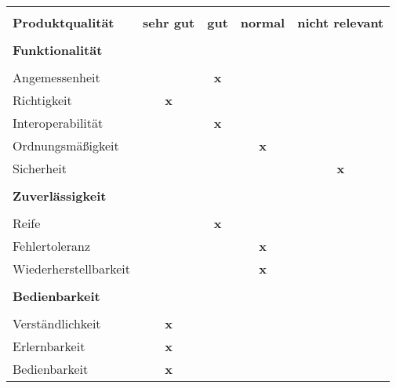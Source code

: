 \begin{table}[H]
\centering

\label{tabelle_qualitaetsziele}
\begin{tabular}{|lcccc|}
\hline 
\rowcolor[RGB]{191,191,255} &&&& \\[-0.35cm]
\rowcolor[RGB]{191,191,255}
\textbf{Produktqualität}       & \textbf{sehr gut} & \textbf{gut} & \textbf{normal} & \textbf{nicht relevant} \\[0.1cm]
\hline 
\rowcolor[RGB]{230,230,230}&&&& \\[-0.35cm] 
\rowcolor[RGB]{230,230,230}\textbf{Funktionalität} &&&&   				  \\[0.1cm] 
\hline &&&& \\[-0.4cm]
Angemessenheit        &          & \textbf{x}   &        &                \\[0.1cm]
Richtigkeit           & \textbf{x}        &     &        &                \\[0.1cm]
Interoperabilität     &          & \textbf{x}   &        &                \\[0.1cm]
Ordnungsmäßigkeit     &          &     & \textbf{x}      &                \\[0.1cm]
Sicherheit            &          &     &        & \textbf{x}              \\[0.1cm]
\rowcolor[RGB]{230,230,230}\hline &&&& \\[-0.35cm]
\rowcolor[RGB]{230,230,230}\textbf{Zuverlässigkeit} &&&&       							 		  \\[0.1cm] 
\hline &&&& \\[-0.4cm]
Reife                 &          & \textbf{x}   &        &                \\[0.1cm]
Fehlertoleranz        &          &     & \textbf{x}      &                \\[0.1cm]
Wiederherstellbarkeit &          &     & \textbf{x}      &                \\[0.1cm] 
\rowcolor[RGB]{230,230,230}\hline &&&& \\[-0.35cm]
\rowcolor[RGB]{230,230,230}\textbf{Bedienbarkeit}&&&&								         		  \\[0.1cm] 
\hline &&&& \\[-0.4cm]
Verständlichkeit      & \textbf{x}        &     &        &                \\[0.1cm]
Erlernbarkeit         & \textbf{x}        &     &        &                \\[0.1cm]
Bedienbarkeit         & \textbf{x}        &     &        &                \\[0.1cm] 

\end{tabular}
\end{table}
